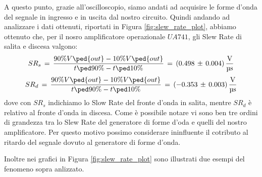 A questo punto, grazie all'oscilloscopio, siamo andati ad acquisire le forme d'onda del segnale in ingresso e in uscita dal nostro circuito. Quindi andando ad analizzare i dati ottenuti, riportati in Figura \ref{fig:slew_rate_plot}, abbiamo ottenuto che, per il nosro amplificatore operazionale $UA741$, gli Slew Rate di salita e discesa  valgono:
\begin{equation}
	SR_s\,=\,\frac{90\%V\ped{out}-10\%V\ped{out}}{t\ped{90\%}-t\ped{10\%}}\,=\,(0.498\,\pm\,0.004)\,\frac{\SI{}{\volt}}{\SI{}{\micro\second}}
	\label{slew_rate_value_s}
\end{equation}
\begin{equation}
	SR_d\,=\,\frac{90\%V\ped{out}-10\%V\ped{out}}{t\ped{90\%}-t\ped{10\%}}\,=\,(-0.353\,\pm\,0.003)\,\frac{\SI{}{\volt}}{\SI{}{\micro\second}}
	\label{slew_rate_value_d}
\end{equation}
dove con $SR_s$ indichiamo lo Slow Rate del fronte d'onda in salita, mentre $SR_d$ è relativo al fronte d'onda in discesa.
Come è possibile notare vi sono ben tre ordini di grandezza tra lo Slew Rate del generatore di forme d'oda e quelli del nostro amplificatore. Per questo motivo possimo considerare ininfluente il cotributo al ritardo del segnale dovuto al generatore di forme d'onda.

Inoltre nei grafici in Figura \ref{fig:slew_rate_plot} sono illustrati due esempi del fenomeno sopra anlizzato.



